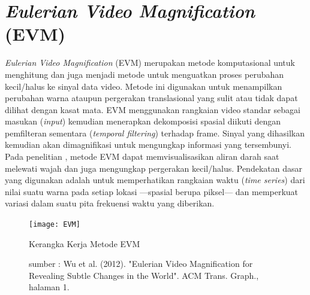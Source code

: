 
\section{\textit{Eulerian Video Magnification} (EVM)}
\textit{Eulerian Video Magnification} (EVM) merupakan metode komputasional untuk menghitung dan juga menjadi metode untuk menguatkan proses perubahan kecil/halus ke sinyal data video. Metode ini digunakan untuk menampilkan perubahan warna ataupun pergerakan translasional yang sulit atau tidak dapat dilihat dengan kasat mata. EVM menggunakan rangkaian video standar sebagai masukan (\textit{input}) kemudian menerapkan dekomposisi spasial diikuti dengan pemfilteran sementara (\textit{temporal filtering}) terhadap frame. Sinyal yang dihasilkan kemudian akan dimagnifikasi untuk mengungkap informasi yang tersembunyi. Pada penelitian \citet{Wu2012}, metode EVM dapat memvisualisasikan aliran darah saat melewati wajah dan juga mengungkap pergerakan kecil/halus. Pendekatan dasar yang digunakan adalah untuk memperhatikan rangkaian waktu (\textit{time series}) dari nilai suatu warna pada setiap lokasi ---spasial berupa piksel--- dan memperkuat variasi dalam suatu pita frekuensi waktu yang diberikan.


\begin{figure}[ht]
\vspace{0.5em}
\centering
 \texttt{[image: EVM]}
 \caption{Kerangka Kerja Metode EVM}
  \caption*{sumber : Wu et al. (2012). "Eulerian Video Magnification for Revealing Subtle Changes in the World". ACM Trans. Graph., halaman 1. }
 \label{fig:EVM}   
\end{figure}

